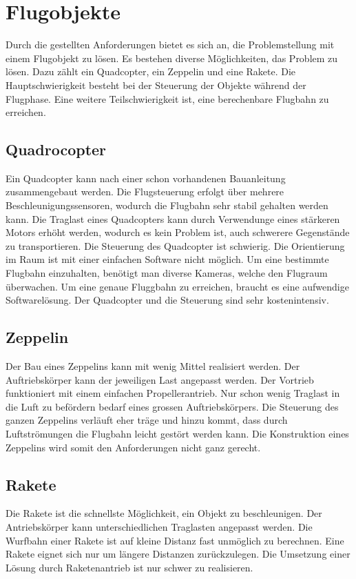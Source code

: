 ﻿\section{Flugobjekte}
Durch die gestellten Anforderungen bietet es sich an, die Problemstellung mit einem Flugobjekt zu lösen. Es bestehen diverse Möglichkeiten, das Problem zu lösen. Dazu zählt ein Quadcopter, ein Zeppelin und eine Rakete. Die Hauptschwierigkeit besteht bei der Steuerung der Objekte während der Flugphase. Eine weitere Teilschwierigkeit ist, eine berechenbare Flugbahn zu erreichen. 

\subsection{Quadrocopter}
Ein Quadcopter kann nach einer schon vorhandenen Bauanleitung zusammengebaut werden. Die Flugsteuerung erfolgt über mehrere Beschleunigungssensoren, wodurch die Flugbahn sehr stabil gehalten werden kann. Die Traglast eines Quadcopters kann durch Verwendunge eines stärkeren Motors erhöht werden, wodurch es kein Problem ist, auch schwerere Gegenstände zu transportieren. Die Steuerung des Quadcopter ist schwierig. Die Orientierung im Raum ist mit einer einfachen Software nicht möglich. Um eine bestimmte Flugbahn einzuhalten, benötigt man diverse Kameras, welche den Flugraum überwachen. Um eine genaue Fluggbahn zu erreichen, braucht es eine aufwendige Softwarelösung. Der Quadcopter und die Steuerung sind sehr kostenintensiv.

\subsection{Zeppelin}
Der Bau eines Zeppelins kann mit wenig Mittel realisiert werden. Der Auftriebskörper kann der jeweiligen Last angepasst werden. Der Vortrieb funktioniert mit einem einfachen Propellerantrieb. Nur schon wenig Traglast in die Luft zu befördern bedarf eines grossen Auftriebskörpers. Die Steuerung des ganzen Zeppelins verläuft eher träge und hinzu kommt, dass durch Luftströmungen die Flugbahn leicht gestört werden kann. Die Konstruktion eines Zeppelins wird somit den Anforderungen nicht ganz gerecht.

\subsection{Rakete}
Die Rakete ist die schnellste Möglichkeit, ein Objekt zu beschleunigen. Der Antriebskörper kann unterschiedlichen Traglasten angepasst werden. Die Wurfbahn einer Rakete ist auf kleine Distanz fast unmöglich zu berechnen. Eine Rakete eignet sich nur um längere Distanzen zurückzulegen. Die Umsetzung einer Lösung durch Raketenantrieb ist nur schwer zu realisieren.
